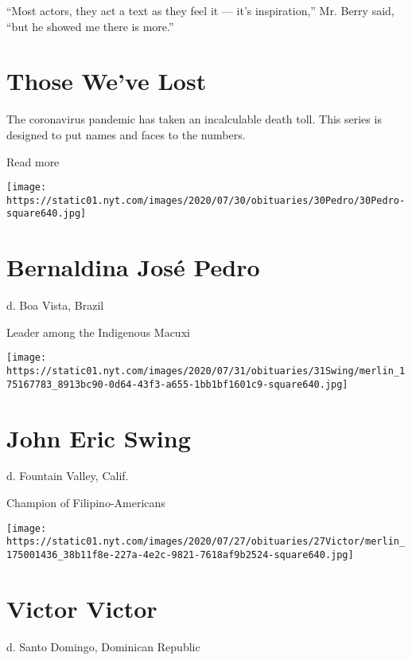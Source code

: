 ``Most actors, they act a text as they feel it --- it's inspiration,''
Mr. Berry said, ``but he showed me there is more.''

\href{https://www.nytimes.com/interactive/2020/obituaries/people-died-coronavirus-obituaries.html?action=click\&pgtype=Article\&state=default\&region=BELOW_MAIN_CONTENT\&context=covid_obits_promo}{}

\hypertarget{those-weve-lost}{%
\section{Those We've Lost}\label{those-weve-lost}}

The coronavirus pandemic has taken an incalculable death toll. This
series is designed to put names and faces to the numbers.

Read more

\texttt{[image: https://static01.nyt.com/images/2020/07/30/obituaries/30Pedro/30Pedro-square640.jpg]}

\hypertarget{bernaldina-josuxe9-pedro}{%
\section{Bernaldina José Pedro}\label{bernaldina-josuxe9-pedro}}

d. Boa Vista, Brazil

Leader among the Indigenous Macuxi

\texttt{[image: https://static01.nyt.com/images/2020/07/31/obituaries/31Swing/merlin\_175167783\_8913bc90-0d64-43f3-a655-1bb1bf1601c9-square640.jpg]}

\hypertarget{john-eric-swing}{%
\section{John Eric Swing}\label{john-eric-swing}}

d. Fountain Valley, Calif.

Champion of Filipino-Americans

\texttt{[image: https://static01.nyt.com/images/2020/07/27/obituaries/27Victor/merlin\_175001436\_38b11f8e-227a-4e2c-9821-7618af9b2524-square640.jpg]}

\hypertarget{victor-victor}{%
\section{Victor Victor}\label{victor-victor}}

d. Santo Domingo, Dominican Republic

